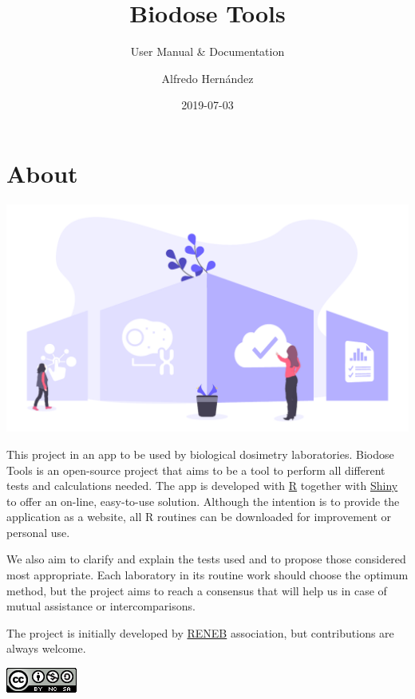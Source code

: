 \documentclass[]{scrartcl}
\title{Biodose Tools}
\subtitle{User Manual \& Documentation}
\author{Alfredo Hernández}
\date{2019-07-03}
\begin{document}

\maketitle

{
\setcounter{tocdepth}{2}
\tableofcontents
}
\hypertarget{about}{%
\section*{About}\label{about}}

\includegraphics{images/home.pdf}

This project in an app to be used by biological dosimetry laboratories. Biodose Tools is an open-source project that aims to be a tool to perform all different tests and calculations needed. The app is developed with \href{https://www.r-project.org/about.html}{R} \citep{R-base} together with \href{https://shiny.rstudio.com}{Shiny} \citep{R-shiny} to offer an on-line, easy-to-use solution. Although the intention is to provide the application as a website, all R routines can be downloaded for improvement or personal use.

We also aim to clarify and explain the tests used and to propose those considered most appropriate. Each laboratory in its routine work should choose the optimum method, but the project aims to reach a consensus that will help us in case of mutual assistance or intercomparisons.

The project is initially developed by \href{http://www.reneb.net}{RENEB} association, but contributions are always welcome.

\begin{center}\includegraphics[width=0.92in]{images/by-nc-sa} \end{center}
\end{document}
